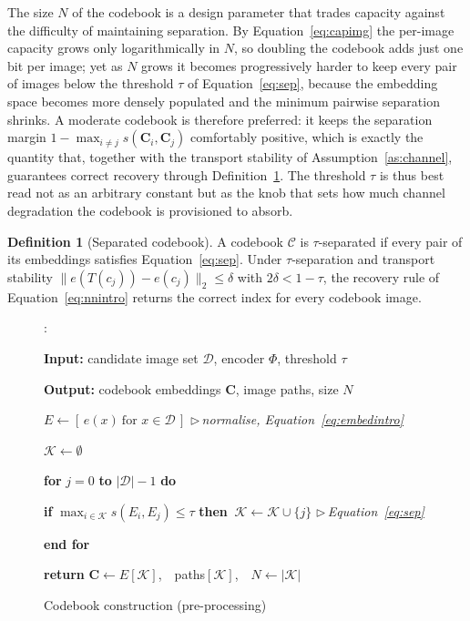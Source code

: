 \documentclass[10pt,a4paper]{article}
\theoremstyle{definition}
\newtheorem{definition}{Definition}[section]
\newcounter{algln}
\begin{document}
The size $N$ of the codebook is a design parameter that trades capacity against the
difficulty of maintaining separation. By Equation~\eqref{eq:capimg} the per-image capacity
grows only logarithmically in $N$, so doubling the codebook adds just one bit per
image; yet as $N$ grows it becomes progressively harder to keep every pair of images
below the threshold $\tau$ of Equation~\eqref{eq:sep}, because the embedding space becomes more
densely populated and the minimum pairwise separation shrinks. A moderate codebook
is therefore preferred: it keeps the separation margin $1-\max_{i\neq j}s(\mathbf{C}
_i,\mathbf{C}_j)$ comfortably positive, which is exactly the quantity that, together
with the transport stability of Assumption~\ref{as:channel}, guarantees correct
recovery through Definition~\ref{def:sep}. The threshold $\tau$ is thus best read
not as an arbitrary constant but as the knob that sets how much channel degradation
the codebook is provisioned to absorb.

\begin{definition}[Separated codebook]\label{def:sep}
A codebook $\mathcal{C}$ is $\tau$-separated if every pair of its embeddings
satisfies Equation~\eqref{eq:sep}. Under $\tau$-separation and transport stability
$\lVert e(T(c_j))-e(c_j)\rVert_2\le\delta$ with $2\delta<1-\tau$, the recovery rule
of Equation~\eqref{eq:nnintro} returns the correct index for every codebook image.
\end{definition}


\begin{figure}[t]\captionsetup{type=algorithm}
\caption{Codebook construction (pre-processing)}\label{alg:codebook}
\begin{list}{\footnotesize{}:}{%
    \setlength{\leftmargin}{2.4em}\setlength{\labelwidth}{1.7em}%
    \setlength{\labelsep}{0.4em}\setlength{\itemsep}{1.5pt}%
    \setlength{\parsep}{0pt}\setlength{\topsep}{3pt}\small}
\item \textbf{Input:} candidate image set $\mathcal{D}$, encoder $\Phi$, threshold $\tau$
\item \textbf{Output:} codebook embeddings $\mathbf{C}$, image paths, size $N$
\item $E \gets [\,e(x)\ \text{for } x\in\mathcal{D}\,]$ \hfill{\footnotesize$\triangleright$\,\textit{normalise, Equation~\eqref{eq:embedintro}}}
\item $\mathcal{K}\gets\emptyset$
\item \textbf{for} $j=0$ \textbf{to} $|\mathcal{D}|-1$ \textbf{do}
\item \hspace*{1.3em} \textbf{if} $\max_{i\in\mathcal{K}} s(E_i,E_j)\le\tau$ \textbf{then}
           $\ \mathcal{K}\gets\mathcal{K}\cup\{j\}$ \hfill{\footnotesize$\triangleright$\,\textit{Equation~\eqref{eq:sep}}}
\item \textbf{end for}
\item \textbf{return} $\mathbf{C}\gets E[\mathcal{K}]$,\ \ paths$[\mathcal{K}]$,\ \ $N\gets|\mathcal{K}|$
\end{list}
\end{figure}
\end{document}
